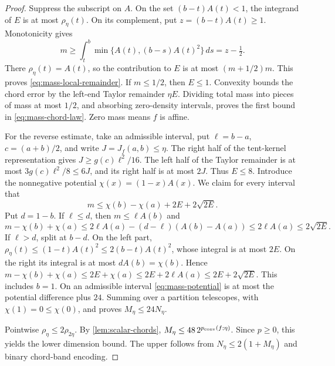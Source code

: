\begin{proof}
Suppress the subscript on $A$. On the set $(b-t)A(t)<1$, the
integrand of $E$ is at most $\rho_\eta(t)$. On its complement, put
$z=(b-t)A(t)\ge1$. Monotonicity gives
\[
 m\ge\int_t^b\min\{A(t),(b-s)A(t)^2\}\,ds=z-\tfrac12.
\]
There $\rho_\eta(t)=A(t)$, so the contribution to $E$ is at most
$(m+1/2)m$. This proves \eqref{eq:mass-local-remainder}. If $m\le1/2$,
then $E\le1$. Convexity bounds the chord error by the left-end Taylor
remainder $\eta E$. Dividing total mass into pieces of mass at most
$1/2$, and absorbing zero-density intervals, proves the first bound
in \eqref{eq:mass-chord-law}. Zero mass means $f$ is affine.

For the reverse estimate, take an admissible interval, put
$\ell=b-a$, $c=(a+b)/2$, and write $J=J_f(a,b)\le\eta$.
The right half of the tent-kernel representation gives
$J\ge g(c)\ell^2/16$. The left half of the Taylor remainder is at
most $3g(c)\ell^2/8\le6J$, and its right half is at most $2J$.
Thus $E\le8$. Introduce the nonnegative potential
$\chi(x)=(1-x)A(x)$. We claim for every interval that
\begin{equation}\label{eq:mass-potential}
 m\le\chi(b)-\chi(a)+2E+2\sqrt{2E}.
\end{equation}
Put $d=1-b$. If $\ell\le d$, then $m\le\ell A(b)$ and
\[
 m-\chi(b)+\chi(a)
 \le2\ell A(a)-(d-\ell)(A(b)-A(a))
 \le2\ell A(a)\le2\sqrt{2E}.
\]
If $\ell>d$, split at $b-d$. On the left part,
$\rho_\eta(t)\le(1-t)A(t)^2\le2(b-t)A(t)^2$, whose integral is at
most $2E$. On the right its integral is at most $dA(b)=\chi(b)$.
Hence $m-\chi(b)+\chi(a)\le2E+\chi(a)
\le2E+2\ell A(a)\le2E+2\sqrt{2E}$. This includes $b=1$.
On an admissible interval \eqref{eq:mass-potential} is at most the
potential difference plus $24$. Summing over a partition telescopes,
with $\chi(1)=0\le\chi(0)$, and proves $M_\eta\le24N_\eta$.

Pointwise $\rho_\eta\le2\rho_{2\eta}$. By
\cref{lem:scalar-chords}, $M_\eta\le48\,2^{p_{\mathrm{conv}}(f;\eta)}$.
Since $p\ge0$, this yields the lower dimension bound. The upper follows
from $N_\eta\le2(1+M_\eta)$ and binary chord-band encoding.
\end{proof}

